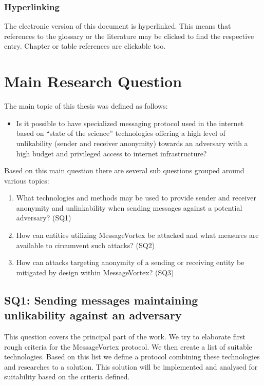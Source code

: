 \subsection{Hyperlinking}
The electronic version of this  document is hyperlinked. This means that references to the glossary or the literature may be clicked to find the respective entry. Chapter or table references are clickable too. 

\chapter{Main Research Question}
The main topic of this thesis was defined as follows:
\begin{itemize}
	\item Is it possible to have specialized messaging protocol used in the internet based on ``state of the science'' technologies offering a high level of unlikability (sender and receiver anonymity) towards an adversary with a high budget and privileged access to internet infrastructure?
\end{itemize}

Based on this main question there are several sub questions grouped around various topics:

\begin{enumerate}
	\item What technologies and methods may be used to provide sender and receiver anonymity and unlinkability when sending messages against a potential adversary? (SQ1)
	\item How can entities utilizing MessageVortex be attacked and what measures are  available to circumvent such attacks? (SQ2)
	\item How can attacks targeting anonymity of a sending or receiving entity be mitigated by design within MessageVortex? (SQ3)
\end{enumerate}

\section{SQ1: Sending messages maintaining unlikability against an adversary}
This question covers the principal part of the work. We try to elaborate first rough criteria for the MessageVortex protocol. We then create a list of suitable technologies. Based on this list we define a protocol combining these technologies and researches to a solution. This solution will be implemented and analysed for suitability based on the criteria defined.

